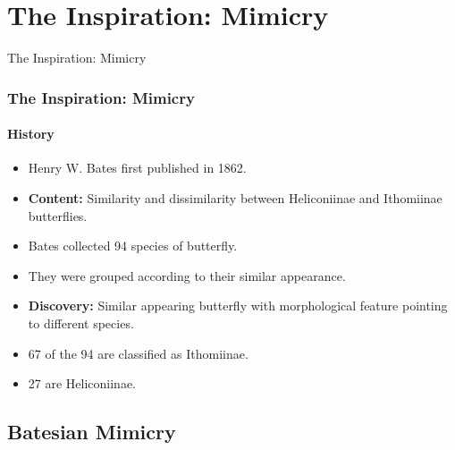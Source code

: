 \section{The Inspiration: Mimicry}

\frame
{
	\begin{center}
		\LARGE The Inspiration: Mimicry
	\end{center}
}

\frame
{
	\frametitle{The Inspiration: Mimicry}
	\framesubtitle{History}
	
	\begin{itemize}
		\item Henry W. Bates first published in 1862.
		\item \textbf{Content:} Similarity and dissimilarity between Heliconiinae and Ithomiinae butterflies. 
		\item Bates collected 94 species of butterfly.
		\item They were grouped according to their similar appearance.
		\item \textbf{Discovery:} Similar appearing butterfly with morphological feature pointing to different species.
		\item 67 of the 94 are classified as Ithomiinae.
		\item 27 are Heliconiinae.
	\end{itemize}
}

\subsection{Batesian Mimicry}

